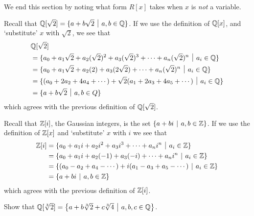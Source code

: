 We end this section by noting what form $R[x]$ takes when $x$ is \textit{not} a variable.
\begin{example}
    Recall that $\Q[\sqrt2] = \{a + b\sqrt2 \vert a,b \in \Q\}$. If we use the definition of $\mathbb{Q}[x]$, and `substitute' $x$ with $\sqrt2$, we see that
    \begin{align*}
        &\Q[\sqrt2] \\
        &= \{a_0 + a_1\sqrt2 + a_2(\sqrt2)^2 + a_3(\sqrt2)^3 + \cdots + a_n(\sqrt2)^n \vert a_i \in \Q \}\\
        &= \{a_0 + a_1\sqrt2 + a_2(2) + a_3(2\sqrt2) + \cdots + a_n(\sqrt2)^n \vert a_i \in \Q \}\\
        &= \{(a_0 + 2a_2 + 4a_4 + \cdots) + \sqrt2 (a_1 + 2a_3 + 4a_5 + \cdots) \vert a_i \in \Q\}\\
        &= \{a + b\sqrt2 \vert a,b \in Q\}
    \end{align*}
    which agrees with the previous definition of $\mathbb{Q}[\sqrt2]$.
\end{example}
\begin{example}
    Recall that $\mathbb{Z}[i]$, the Gaussian integers, is the set $\{a+bi \vert a,b \in \Z\}$. If we use the definition of $\mathbb{Z}[x]$ and `substitute' $x$ with $i$ we see that
    \begin{align*}
        \Z[i] &= \{a_0 + a_1i + a_2i^2 + a_3i^3 + \cdots + a_ni^n \vert a_i \in \Z\}\\
        &= \{a_0 + a_1i + a_2(-1) + a_3(-i) + \cdots + a_ni^n \vert a_i \in \Z\}\\
        &= \{(a_0 - a_2 + a_4 - \cdots) + i(a_1 - a_3 + a_5 - \cdots) \vert a_i \in \Z\}\\
        &= \{a + bi \vert a,b \in \Z\}
    \end{align*}
    which agrees with the previous definition of $\mathbb{Z}[i]$.
\end{example}

\begin{exercise}
    Show that $\Q[\sqrt[3]{2}] = \left\{a + b\sqrt[3]{2} + c\sqrt[3]4 \vert a,b,c \in \Q\right\}$.
\end{exercise}

